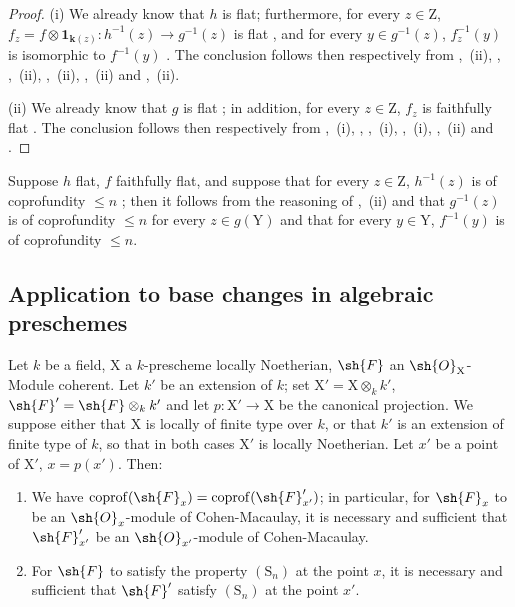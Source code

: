 \begin{proof}
(i) We already know  that $h$ is flat; furthermore, for every $z\in\mathrm{Z}$, $f_z=f\otimes\mathbf{1}_{\boldsymbol{k}(z)}:h^{-1}(z)\to g^{-1}(z)$ is flat , and for every $y\in g^{-1}(z)$, $f_z^{-1}(y)$ is isomorphic to $f^{-1}(y)$ . The conclusion follows then respectively from ,~(ii), , ,~(ii), ,~(ii), ,~(ii) and ,~(ii).

(ii) We already know that $g$ is flat ; in addition, for every $z\in\mathrm{Z}$, $f_z$ is faithfully flat . The conclusion follows then respectively from ,~(i), , ,~(i), ,~(i), ,~(ii) and .
\end{proof}

\begin{remark}[6.6.2]
\label{IV.6.6.2}
Suppose $h$ flat, $f$ faithfully flat, and suppose that for every $z\in\mathrm{Z}$, $h^{-1}(z)$ is of coprofundity $\leqslant n$ ; then it follows from the reasoning of ,~(ii) and  that $g^{-1}(z)$ is of coprofundity $\leqslant n$ for every $z\in g(\mathrm{Y})$ and that for every $y\in\mathrm{Y}$, $f^{-1}(y)$ is of coprofundity $\leqslant n$.
\end{remark}

\subsection{Application to base changes in algebraic preschemes}
\label{subsection:IV.6.7}


\begin{proposition}[6.7.1]
\label{IV.6.7.1}
Let $k$ be a field, $\mathrm{X}$ a $k$-prescheme locally Noetherian, $\sh{F}$ an $\sh{O}_\mathrm{X}$-Module coherent. Let $k'$ be an extension of $k$; set $\mathrm{X}'=\mathrm{X}\otimes_k k'$, $\sh{F}'=\sh{F}\otimes_k k'$ and let $p:\mathrm{X}'\to\mathrm{X}$ be the canonical projection. We suppose either that $\mathrm{X}$ is locally of finite type over $k$, or that $k'$ is an extension of finite type of $k$, so that in both cases $\mathrm{X}'$ is locally Noetherian. Let $x'$ be a point of $\mathrm{X}'$, $x=p(x')$. Then:
\begin{enumerate}[label=(\roman*)]
  \item We have $\operatorname{coprof}(\sh{F}_x)=\operatorname{coprof}(\sh{F}'_{x'})$; in particular, for $\sh{F}_x$ to be an $\sh{O}_x$-module of Cohen-Macaulay, it is necessary and sufficient that $\sh{F}'_{x'}$ be an $\sh{O}_{x'}$-module of Cohen-Macaulay.
  \item For $\sh{F}$ to satisfy the property $(\mathrm{S}_n)$ at the point $x$, it is necessary and sufficient that $\sh{F}'$ satisfy $(\mathrm{S}_n)$ at the point $x'$.
\end{enumerate}
\end{proposition}

